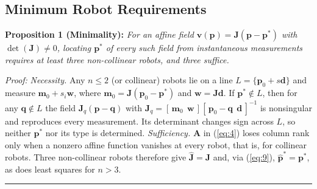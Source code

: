 \documentclass[11pt]{article}
\providecommand{\IEEEQED}{\rule{1.3ex}{1.3ex}}
\begin{document}
\subsection*{Minimum Robot Requirements}

\noindent\textbf{Proposition 1 (Minimality):} \textit{For an affine field $\mathbf{v}(\mathbf{p}) = \mathbf{J}(\mathbf{p}-\mathbf{p}^*)$ with $\det(\mathbf{J}) \neq 0$, locating $\mathbf{p}^*$ of every such field from instantaneous measurements requires at least three non-collinear robots, and three suffice.}

\smallskip
\noindent\textit{Proof:} \textit{Necessity.} Any $n \le 2$ (or collinear) robots lie on a line $L = \{\mathbf{p}_0 + s\mathbf{d}\}$ and measure $\mathbf{m}_0 + s_i\mathbf{w}$, where $\mathbf{m}_0 = \mathbf{J}(\mathbf{p}_0 - \mathbf{p}^*)$ and $\mathbf{w} = \mathbf{J}\mathbf{d}$. If $\mathbf{p}^* \notin L$, then for any $\mathbf{q} \notin L$ the field $\mathbf{J}_q(\mathbf{p} - \mathbf{q})$ with $\mathbf{J}_q = [\,\mathbf{m}_0\ \ \mathbf{w}\,][\,\mathbf{p}_0 - \mathbf{q}\ \ \mathbf{d}\,]^{-1}$ is nonsingular and reproduces every measurement. Its determinant changes sign across $L$, so neither $\mathbf{p}^*$ nor its type is determined. \textit{Sufficiency.} $\mathbf{A}$ in (\ref{eq:4}) loses column rank only when a nonzero affine function vanishes at every robot, that is, for collinear robots. Three non-collinear robots therefore give $\hat{\mathbf{J}} = \mathbf{J}$ and, via (\ref{eq:9}), $\hat{\mathbf{p}}^* = \mathbf{p}^*$, as does least squares for $n > 3$. \hfill\IEEEQED
\end{document}
